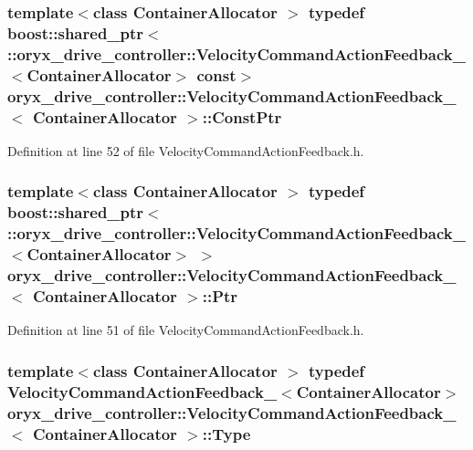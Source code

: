 \subsubsection[{\-Const\-Ptr}]{\setlength{\rightskip}{0pt plus 5cm}template$<$class Container\-Allocator $>$ typedef boost\-::shared\-\_\-ptr$<$ \-::{\bf oryx\-\_\-drive\-\_\-controller\-::\-Velocity\-Command\-Action\-Feedback\-\_\-}$<$\-Container\-Allocator$>$ const$>$ {\bf oryx\-\_\-drive\-\_\-controller\-::\-Velocity\-Command\-Action\-Feedback\-\_\-}$<$ \-Container\-Allocator $>$\-::{\bf \-Const\-Ptr}}\label{structoryx__drive__controller_1_1VelocityCommandActionFeedback___ae9adf26eba5f31ae59e8d22ce78f524d}


\-Definition at line 52 of file \-Velocity\-Command\-Action\-Feedback.\-h.

\subsubsection[{\-Ptr}]{\setlength{\rightskip}{0pt plus 5cm}template$<$class Container\-Allocator $>$ typedef boost\-::shared\-\_\-ptr$<$ \-::{\bf oryx\-\_\-drive\-\_\-controller\-::\-Velocity\-Command\-Action\-Feedback\-\_\-}$<$\-Container\-Allocator$>$ $>$ {\bf oryx\-\_\-drive\-\_\-controller\-::\-Velocity\-Command\-Action\-Feedback\-\_\-}$<$ \-Container\-Allocator $>$\-::{\bf \-Ptr}}\label{structoryx__drive__controller_1_1VelocityCommandActionFeedback___a9dc449fe693baf963b344472dd527a53}


\-Definition at line 51 of file \-Velocity\-Command\-Action\-Feedback.\-h.

\subsubsection[{\-Type}]{\setlength{\rightskip}{0pt plus 5cm}template$<$class Container\-Allocator $>$ typedef {\bf \-Velocity\-Command\-Action\-Feedback\-\_\-}$<$\-Container\-Allocator$>$ {\bf oryx\-\_\-drive\-\_\-controller\-::\-Velocity\-Command\-Action\-Feedback\-\_\-}$<$ \-Container\-Allocator $>$\-::{\bf \-Type}}\label{structoryx__drive__controller_1_1VelocityCommandActionFeedback___a77d6ed3affaa85c179852c99a00a2230}


